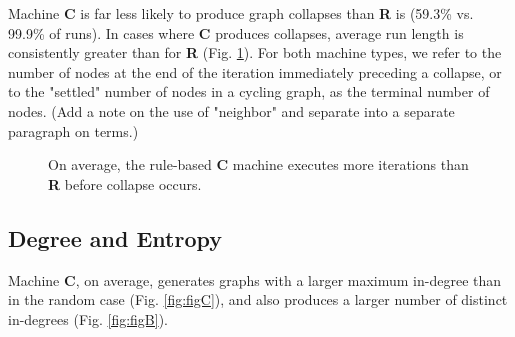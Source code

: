 \documentclass[twoside,twocolumn]{article}
\begin{document}
Machine \textbf{C} is far less likely to produce graph collapses than
\textbf{R} is (59.3\% vs. 99.9\% of runs). In cases where \textbf{C} produces
collapses, average run length is consistently greater than
for \textbf{R} (Fig. \ref{fig:figA}). For both machine types, we refer to
the number of nodes at the end of the iteration immediately preceding a collapse,
or to the "settled" number of nodes in a cycling graph, as the terminal number of nodes.
(Add a note on the use of "neighbor" and separate into a separate paragraph on terms.)

\begin{figure}
  \caption{On average, the rule-based \textbf{C} machine executes more iterations than \textbf{R} before collapse occurs.}
  \label{fig:figA}
\end{figure}

\subsection{Degree and Entropy}

Machine \textbf{C}, on average, generates graphs with a larger 
maximum in-degree than in the random case (Fig. \ref{fig:figC}), and also produces a
larger number of distinct in-degrees (Fig. \ref{fig:figB}).
\end{document}
